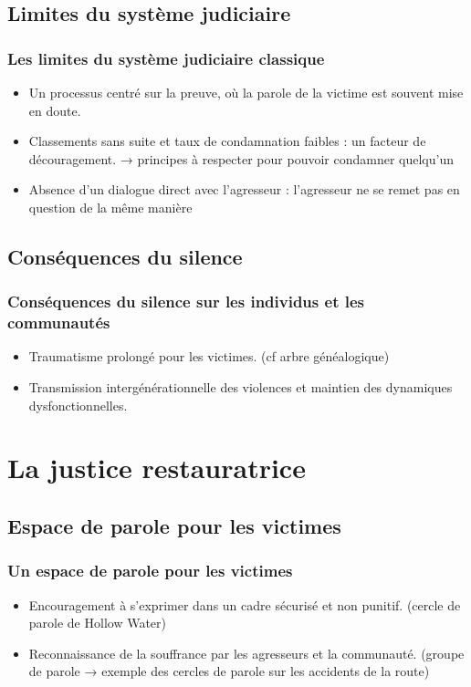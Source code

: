 \documentclass[french]{beamer}
\begin{document}
\subsection{Limites du système judiciaire}
\begin{frame}
	\frametitle{Les limites du système judiciaire classique}
	\begin{itemize}
		\item Un processus centré sur la preuve, où la parole de la victime est souvent mise en doute.
		\item Classements sans suite et taux de condamnation faibles : un facteur de découragement. → principes à respecter pour pouvoir condamner quelqu’un
		\item Absence d’un dialogue direct avec l’agresseur : l’agresseur ne se remet pas en question de la même manière
	\end{itemize}
\end{frame}

\subsection{Conséquences du silence}
\begin{frame}
	\frametitle{Conséquences du silence sur les individus et les communautés}
	\begin{itemize}
		\item Traumatisme prolongé pour les victimes. (cf arbre généalogique)
		\item Transmission intergénérationnelle des violences et maintien des dynamiques dysfonctionnelles.
	\end{itemize}
\end{frame}

\section{La justice restauratrice}
\subsection{Espace de parole pour les victimes}
\begin{frame}
	\frametitle{Un espace de parole pour les victimes}
	\begin{itemize}
		\item Encouragement à s’exprimer dans un cadre sécurisé et non punitif. (cercle de parole de Hollow Water)
		\item Reconnaissance de la souffrance par les agresseurs et la communauté. (groupe de parole → exemple des cercles de parole sur les accidents de la route)
	\end{itemize}
\end{frame}
\end{document}
